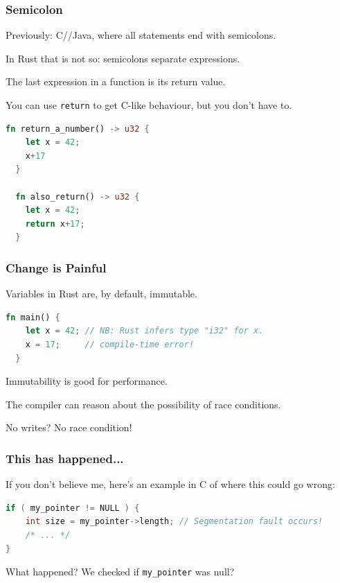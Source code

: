 \begin{frame}[fragile]
\frametitle{Semicolon}

Previously: C/\CPP/Java, where all statements end with semicolons.

In Rust that is not so: semicolons separate expressions. 

The last expression in a function is its return value. 

You can use \texttt{return} to get C-like behaviour, but you don't have to.
\begin{lstlisting}[language=Rust]
  fn return_a_number() -> u32 {
    let x = 42;
    x+17
  }

  fn also_return() -> u32 {
    let x = 42;
    return x+17;
  }
\end{lstlisting}
\end{frame}


\begin{frame}[fragile]
\frametitle{Change is Painful}

Variables in Rust are, by default, immutable.

\begin{lstlisting}[language=Rust]
  fn main() {
    let x = 42; // NB: Rust infers type "i32" for x.
    x = 17;     // compile-time error!
  }
\end{lstlisting}

Immutability is good for performance.

The compiler can reason about the possibility of race conditions.

No writes? No race condition!

\end{frame}


\begin{frame}[fragile]
\frametitle{This has happened...}

If you don't believe me, here's an example in C of where this could go wrong:
\begin{lstlisting}[language=C]
if ( my_pointer != NULL ) {
    int size = my_pointer->length; // Segmentation fault occurs!
    /* ... */
}
\end{lstlisting}

What happened? We checked if \texttt{my\_pointer} was null?

\end{frame}



